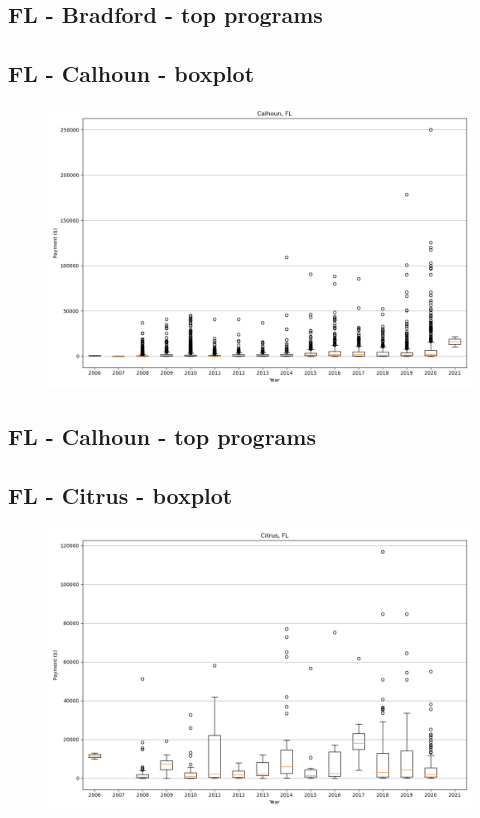 \subsection*{FL - Bradford - top programs}

\newpage
\subsection*{FL - Calhoun - boxplot}
\begin{figure}[h]
\centering
\includegraphics[width=7in]{../output/boxplots/counties/Calhoun-FL_boxplot.png}
\end{figure}


\subsection*{FL - Calhoun - top programs}

\newpage
\subsection*{FL - Citrus - boxplot}
\begin{figure}[h]
\centering
\includegraphics[width=7in]{../output/boxplots/counties/Citrus-FL_boxplot.png}
\end{figure}


